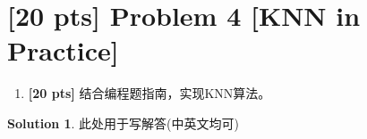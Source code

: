 \documentclass[a4paper,UTF8]{article}
\theoremstyle{definition}
\newtheorem*{solution}{Solution}
\begin{document}
	




\section*{[20 pts] Problem 4 [KNN in Practice]}

\par 
\begin{enumerate}[(1)]
	\item \textbf{[20 pts]} 结合编程题指南，实现KNN算法。

\end{enumerate}

\begin{solution}
此处用于写解答(中英文均可)
\end{solution}
\end{document}
